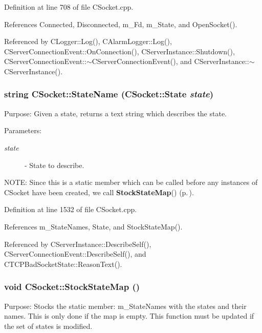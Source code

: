 Definition at line 708 of file CSocket.cpp.

References Connected, Disconnected, m\_\-Fd, m\_\-State, and Open\-Socket().

Referenced by CLogger::Log(), CAlarm\-Logger::Log(), CServer\-Connection\-Event::On\-Connection(), CServer\-Instance::Shutdown(), CServer\-Connection\-Event::$\sim$CServer\-Connection\-Event(), and CServer\-Instance::$\sim$CServer\-Instance().
\subsubsection{\setlength{\rightskip}{0pt plus 5cm}string CSocket::State\-Name ({\bf CSocket::State} {\em state})\hspace{0.3cm}{\tt  [static]}}\label{classCSocket_d0}


Purpose: Given a state, returns a text string which describes the state. \begin{Desc}
\item[Parameters: ]\par
\begin{description}
\item[{\em 
state}]- State to describe.\end{description}
\end{Desc}
NOTE: Since this is a static member which can be called before any instances of CSocket have been created, we call {\bf Stock\-State\-Map}() {\rm (p.\,\pageref{classCSocket_e0})}. 

Definition at line 1532 of file CSocket.cpp.

References m\_\-State\-Names, State, and Stock\-State\-Map().

Referenced by CServer\-Instance::Describe\-Self(), CServer\-Connection\-Event::Describe\-Self(), and CTCPBad\-Socket\-State::Reason\-Text().
\subsubsection{\setlength{\rightskip}{0pt plus 5cm}void CSocket::Stock\-State\-Map ()\hspace{0.3cm}{\tt  [static, protected]}}\label{classCSocket_e0}


Purpose: Stocks the static member: m\_\-State\-Names with the states and their names. This is only done if the map is empty. This function must be updated if the set of states is modified. 

